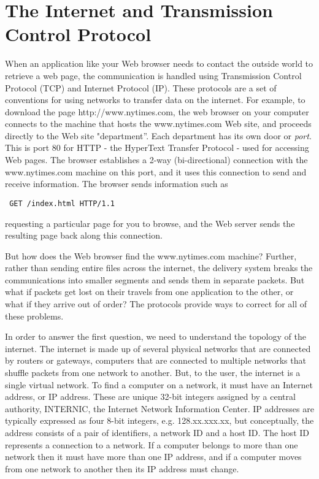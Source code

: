 \section{The Internet and Transmission Control Protocol}
When an application like your Web browser needs to contact
the outside world to retrieve a web page, the communication is handled 
using Transmission Control Protocol (TCP) and Internet Protocol (IP).
These protocols are a set of conventions for using networks to transfer
data on the internet.
For example, to download the page http://www.nytimes.com, the web browser on
your computer connects to the machine that hosts the www.nytimes.com 
Web site, and proceeds directly to the Web site "department''. 
Each department has its own door or \textit{port}.
This is port 80 for HTTP - the HyperText Transfer Protocol - used for
accessing Web pages.  
The browser establishes a 2-way (bi-directional)
connection with the www.nytimes.com machine on this port, and 
it uses this connection to send and receive information.
The browser sends information such as
\begin{verbatim}
 GET /index.html HTTP/1.1
 \end{verbatim}
requesting a particular page for you to browse, and 
the Web server sends the resulting page back along this connection.

But how does the Web browser find the www.nytimes.com machine?
Further, rather than sending entire files across the internet, 
the delivery system breaks the communications into
smaller segments and sends them in separate packets.  
But what if packets get lost on their travels from one application 
to the other, or what if they arrive out of order?  
The protocols provide ways to correct for all of these problems. 

In order to answer the first question, we need to understand the 
topology of the internet. 
The internet is made up of several physical networks that are
connected by routers or gateways, computers that are connected
to multiple networks that shuffle packets from one network to another.
But, to the user, the internet is a single virtual network. 
To find a computer on a network, it must have 
an Internet address, or IP address.
These are unique 32-bit integers assigned by a central authority,
INTERNIC, the Internet Network Information Center.
IP addresses are typically expressed as four 8-bit integers, 
e.g. 128.xx.xxx.xx, but conceptually, the address consists of a 
pair of identifiers, a network ID and a host ID. 
The host ID represents a connection to a network.
If a computer belongs to more than one network then
it must have more than one IP address, and if a computer moves
from one network to another then its IP address must change.


